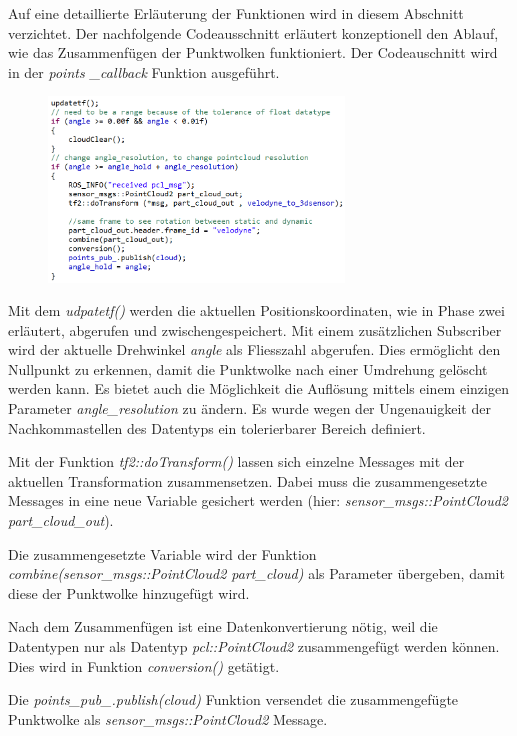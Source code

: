 Auf eine detaillierte Erläuterung der Funktionen wird in diesem Abschnitt verzichtet. Der nachfolgende Codeausschnitt erläutert konzeptionell den Ablauf, wie das Zusammenfügen der Punktwolken funktioniert. Der Codeauschnitt wird in der \textit{points \_callback} Funktion ausgeführt.
\begin{figure}[H]
\includegraphics[width=0.7\textwidth]{resources/sourcecode/combine.png}
\end{figure}

Mit dem \textit{udpatetf()} werden die aktuellen Positionskoordinaten, wie in Phase zwei erläutert, abgerufen und zwischengespeichert. 	
Mit einem zusätzlichen Subscriber wird der aktuelle Drehwinkel \textit{angle} als Fliesszahl abgerufen. Dies ermöglicht den Nullpunkt zu erkennen, damit die Punktwolke nach einer Umdrehung gelöscht werden kann. Es bietet auch die Möglichkeit die Auflösung mittels einem einzigen Parameter \textit{angle\_resolution} zu ändern. Es wurde wegen der Ungenauigkeit der Nachkommastellen des Datentyps ein tolerierbarer Bereich definiert.
	
Mit der Funktion \textit{tf2::doTransform()} lassen sich einzelne Messages mit der aktuellen Transformation zusammensetzen. Dabei muss die zusammengesetzte Messages in eine neue Variable gesichert werden (hier:  \textit{sensor\_msgs::PointCloud2 part\_cloud\_out}). 

Die zusammengesetzte Variable wird der Funktion \textit{combine(sensor\_msgs::PointCloud2 part\_cloud)} als Parameter übergeben, damit diese der Punktwolke hinzugefügt wird. 

Nach dem Zusammenfügen ist eine Datenkonvertierung nötig, weil die Datentypen nur als Datentyp \textit{pcl::PointCloud2} zusammengefügt werden können. Dies wird in Funktion \textit{conversion()} getätigt.

Die \textit{points\_pub\_.publish(cloud)} Funktion versendet die zusammengefügte Punktwolke als  \textit{sensor\_msgs::PointCloud2} Message.


